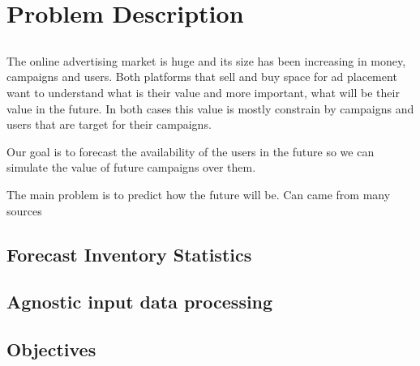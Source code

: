 \chapter{Problem Description}\label{chap:chap3}

\section*{}

The online advertising market is huge and its size has been increasing in money,
campaigns and users. Both platforms that sell and buy space for ad placement
want to understand what is their value and more important, what will be their
value in the future. In both cases this value is mostly constrain by campaigns
and users that are target for their campaigns.

Our goal is to forecast the availability of the users in the future so we can
simulate the value of future campaigns over them.

The main problem is to predict how the future will be.
Can came from many sources

\section{Forecast Inventory Statistics}

\section{Agnostic input data processing}

\section{Objectives}


